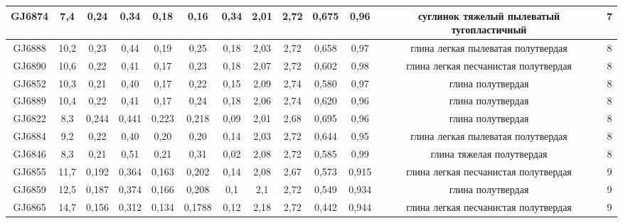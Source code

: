 \begin{sidewaystable}[]
\begin{tabular}{|c|c|c|c|c|c|c|c|c|c|c|c|c|}
    GJ6874          & 7,4        & 0,24                         & 0,34   & 0,18   & 0,16   & 0,34     & 2,01     & 2,72      & 0,675   & 0,96     & суглинок тяжелый   пылеватый тугопластичный  & 7   \\ \hline
    GJ6888          & 10,2       & 0,23                         & 0,44   & 0,19   & 0,25   & 0,18     & 2,03     & 2,72      & 0,658   & 0,97     & глина легкая   пылеватая полутвердая         & 8   \\ \hline
    GJ6890          & 10,6       & 0,22                         & 0,41   & 0,17   & 0,23   & 0,18     & 2,07     & 2,72      & 0,602   & 0,98     & глина легкая   песчанистая полутвердая       & 8   \\ \hline
    GJ6852          & 10,3       & 0,21                         & 0,40   & 0,17   & 0,22   & 0,15     & 2,09     & 2,74      & 0,580   & 0,97     & глина полутвердая                            & 8   \\ \hline
    GJ6889          & 10,4       & 0,22                         & 0,41   & 0,17   & 0,24   & 0,18     & 2,06     & 2,74      & 0,620   & 0,96     & глина полутвердая                            & 8   \\ \hline
    GJ6822          & 8,3        & 0,244                        & 0,441  & 0,223  & 0,218  & 0,09     & 2,01     & 2,68      & 0,695   & 0,96     & глина полутвердая                            & 8   \\ \hline
    GJ6884          & 9,2        & 0,22                         & 0,40   & 0,20   & 0,20   & 0,14     & 2,03     & 2,72      & 0,644   & 0,95     & глина легкая   пылеватая полутвердая         & 8   \\ \hline
    GJ6846          & 8,3        & 0,21                         & 0,51   & 0,21   & 0,31   & 0,02     & 2,08     & 2,72      & 0,585   & 0,99     & глина тяжелая   полутвердая                  & 8   \\ \hline
    GJ6855          & 11,7       & 0,192                        & 0,364  & 0,163  & 0,202  & 0,14     & 2,08     & 2,67      & 0,573   & 0,915    & глина легкая   песчанистая полутвердая       & 9   \\ \hline
    GJ6859          & 12,5       & 0,187                        & 0,374  & 0,166  & 0,208  & 0,1      & 2,1      & 2,72      & 0,549   & 0,934    & глина полутвердая                            & 9   \\ \hline
    GJ6865          & 14,7       & 0,156                        & 0,312  & 0,134  & 0,1788 & 0,12     & 2,18     & 2,72      & 0,442   & 0,944    & глина легкая   песчанистая полутвердая       & 9   \\ \hline

\end{tabular}
\end{sidewaystable}
